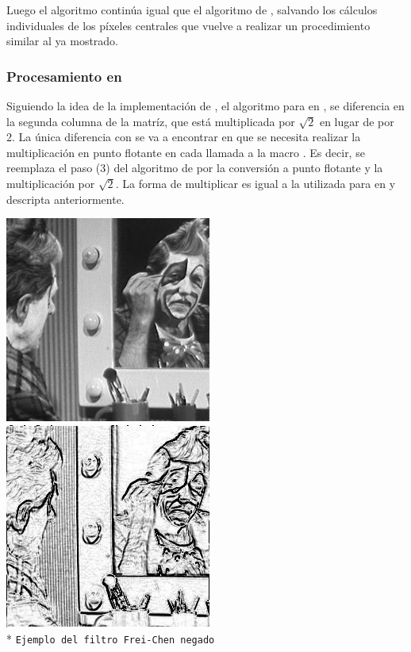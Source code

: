 Luego el algoritmo continúa igual que el algoritmo de , salvando los cálculos individuales de los píxeles centrales que vuelve a realizar 
un procedimiento similar al ya mostrado.


\subsubsection{Procesamiento en }
	Siguiendo la idea de la implementación de , el algoritmo para  en , se diferencia en la segunda 
columna de la matríz, que está multiplicada por $\sqrt{2}$ en lugar de por 2. La única diferencia con  se va a encontrar en que se 
necesita realizar la multiplicación en punto flotante en cada llamada a la macro . Es decir, se reemplaza el paso (3) del algoritmo
de  por la conversión a punto flotante y la multiplicación por $\sqrt{2}$. La forma de multiplicar es igual a la utilizada para
 en  y descripta anteriormente.

\begin{center}
\vspace{1.0cm}
\includegraphics[scale=0.5]{../imgs/cln1.jpg}
\includegraphics[scale=0.5]{../imgs/cln1-frei-chen.jpg} \\*
\texttt{\small Ejemplo del filtro Frei-Chen negado } \\
\end{center}

